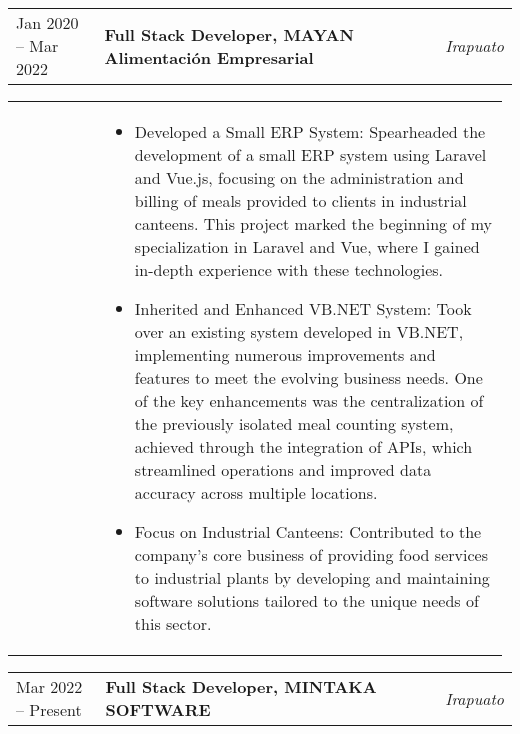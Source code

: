 \documentclass[letter,10pt]{article}
\begin{document}
\begin{tabular}{@{} p{0.18\linewidth} p{0.704\linewidth} p{0.2\linewidth} @{}}
Jan 2020 -- Mar 2022 & \textbf{Full Stack Developer, MAYAN Alimentación Empresarial}  & \textit{Irapuato}
\end{tabular}
\vspace{-3mm}
\par
\begin{tabular}{@{} p{0.18\linewidth} p{0.7965\linewidth} @{}}
&
\begin{itemize}[leftmargin=*, nosep]
\item Developed a Small ERP System: Spearheaded the development of a small ERP system using Laravel and Vue.js, focusing on the administration and billing of meals provided to clients in industrial canteens. This project marked the beginning of my specialization in Laravel and Vue, where I gained in-depth experience with these technologies.
\item Inherited and Enhanced VB.NET System: Took over an existing system developed in VB.NET, implementing numerous improvements and features to meet the evolving business needs. One of the key enhancements was the centralization of the previously isolated meal counting system, achieved through the integration of APIs, which streamlined operations and improved data accuracy across multiple locations.
\item Focus on Industrial Canteens: Contributed to the company's core business of providing food services to industrial plants by developing and maintaining software solutions tailored to the unique needs of this sector.
\end{itemize}
\end{tabular}
\newpage
\begin{tabular}{@{} p{0.18\linewidth} p{0.704\linewidth} p{0.2\linewidth} @{}}
Mar 2022 -- Present & \textbf{Full Stack Developer, MINTAKA SOFTWARE}  & \textit{Irapuato}
\end{tabular}
\vspace{-3mm}
\par
\end{document}
